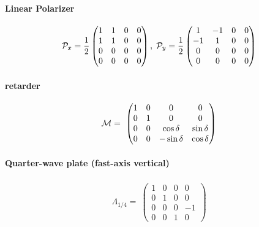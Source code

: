 \paragraph{Linear Polarizer}
\begin{align}
\mathcal{P}_x=\frac{1}{2}
\begin{pmatrix}
    1 & 1 & 0 & 0 \\
    1 & 1 & 0 & 0 \\
    0 & 0 & 0 & 0 \\
    0 & 0 & 0 & 0
  \end{pmatrix}
, \;
\mathcal{P}_y=\frac{1}{2}
\begin{pmatrix}
     1 & -1 & 0 & 0 \\
    -1 &  1 & 0 & 0 \\
     0 &  0 & 0 & 0 \\
     0 &  0 & 0 & 0
\end{pmatrix}
\end{align}
% 
\paragraph{retarder}
\begin{align}
\mathcal{M}=\
\begin{pmatrix}
    1 & 0 & 0 &  0 \\
    0 & 1 & 0 &  0 \\
    0 & 0 & \cos \delta & \sin \delta \\
    0 & 0 & -\sin \delta &  \cos \delta
\end{pmatrix}
\end{align}
% 
\paragraph{Quarter-wave plate (fast-axis vertical)}
\begin{align}
\Lambda_{1/4}=\
\begin{pmatrix}
    1 & 0 & 0 &  0 \\
    0 & 1 & 0 &  0 \\
    0 & 0 & 0 & -1 \\
    0 & 0 & 1 &  0
\end{pmatrix}
\end{align}
% 
